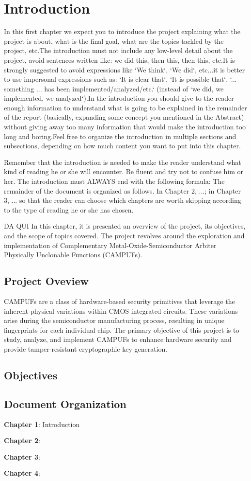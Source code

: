\chapter{Introduction}
In this first chapter we expect you to introduce the project explaining what the project is about, what is the final goal, what are the topics tackled by the project, etc.\newline The introduction must not include any low-level detail about the project, avoid sentences written like: we did this, then this, then this, etc.\newline It is strongly suggested to avoid expressions like `We think`, `We did`, etc...it is better to use impersonal expressions such as: `It is clear that`, `It is possible that`, `... something ... has been implemented/analyzed/etc.` (instead of `we did, we implemented, we analyzed`).\newline In the introduction you should give to the reader enough information to understand what is going to be explained in the remainder of the report (basically, expanding some concept you mentioned in the Abstract) without giving away too many information that would make the introduction too long and boring.\newline Feel free to organize the introduction in multiple sections and subsections, depending on how much content you want to put into this chapter.

Remember that the introduction is needed to make the reader understand what kind of reading he or she will encounter. Be fluent and try not to confuse him or her.
The introduction must ALWAYS end with the following formula: The remainder of the document is organized as follows. In Chapter 2, ...; in Chapter 3, ... so that the reader can choose which chapters are worth skipping according to the type of reading he or she has chosen.




DA QUI
In this chapter, it is presented an overview of the project, its objectives, and the scope of topics covered. The project revolves around the exploration and implementation of Complementary Metal-Oxide-Semiconductor Arbiter Physically Unclonable Functions (CAMPUFs).
\section {Project Oveview}
CAMPUFs are a class of hardware-based security primitives that leverage the inherent physical variations within CMOS integrated circuits. These variations arise during the semiconductor manufacturing process, resulting in unique fingerprints for each individual chip. The primary objective of this project is to study, analyze, and implement CAMPUFs to enhance hardware security and provide tamper-resistant cryptographic key generation.

\section {Objectives}

\section {Document Organization}
\textbf{Chapter 1}: Introduction


\textbf{Chapter 2}:


\textbf{Chapter 3}:


\textbf{Chapter 4}: